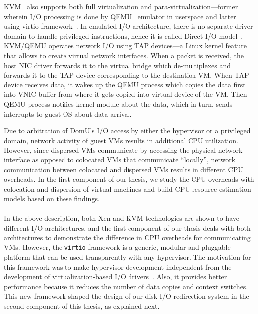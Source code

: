 KVM~\cite{kvm} also supports both full virtualization and
para-virtualization---former wherein I/O
processing is done by QEMU~\cite{qemu} emulator in 
userspace\cite{kvm-whitepaper}
and latter using virtio framework~\cite{virtio}.
In emulated I/O architecture, there is no separate driver domain to handle 
privileged instructions, hence it is called 
Direct I/O model~\cite{net-fairness-visa-2010}.
KVM/QEMU operates network I/O using TAP devices---a Linux kernel feature
that allows to create virtual network interfaces. When a packet is received,
the host NIC driver forwards it to the virtual bridge which de-multiplexes
and forwards it to the TAP device corresponding to the destination VM. 
When TAP device receives data, it wakes up the QEMU process which
copies the data first into VNIC buffer from where it gets copied 
into virtual device of the VM. Then QEMU process notifies kernel module
about the data, which in turn, sends interrupts to guest OS about data arrival.

Due to arbitration of DomU's I/O access by either the hypervisor or a
privileged domain, network activity of guest VMs results in additional
CPU utilization. However, since dispersed VMs communicate
by accessing the physical network interface as opposed to colocated VMs
that communicate ``locally'', network communication between
colocated and dispersed VMs results in different CPU overheads.
In the first component of our thesis, we study the CPU overheads
with colocation and dispersion of virtual machines and
build CPU resource estimation models based on these findings.
\\
\\
In the above description, both Xen and KVM technologies are shown to 
have different I/O architectures, and the first component of our 
thesis deals with both architectures to demonstrate the difference
in CPU overheads for communicating VMs.
However, the \texttt{virtio} framework 
is a generic, modular and pluggable 
platform that can be used transparently with 
any hypervisor. The motivation for this framework was to
make hypervisor development
independent from the development of virtualization-based 
I/O drivers~\cite{virtio}. Also, it provides better performance
because it reduces the number of data copies and context switches.
This new framework shaped the design of our disk I/O redirection system
in the second component of this thesis, as explained next.

